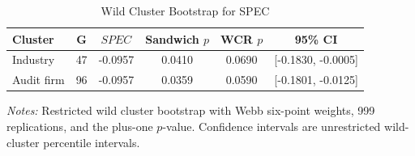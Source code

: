 \begin{table}[H]
    \centering
    \caption{Wild Cluster Bootstrap for SPEC}
    \label{tab:wild_cluster_bootstrap_spec}
    \begin{tabular}{lccccc}
        \toprule
        Cluster & G & \(SPEC\) & Sandwich \(p\) & WCR \(p\) & 95\% CI \\
        \midrule
        Industry & 47 & -0.0957 & 0.0410 & 0.0690 & [-0.1830, -0.0005] \\
        Audit firm & 96 & -0.0957 & 0.0359 & 0.0590 & [-0.1801, -0.0125] \\
        \bottomrule
    \end{tabular}
    \par\smallskip
    \begin{minipage}{0.95\textwidth}
        \footnotesize
        \textit{Notes:} Restricted wild cluster bootstrap with Webb six-point weights, 999 replications, and the plus-one $p$-value. Confidence intervals are unrestricted wild-cluster percentile intervals.
    \end{minipage}
\end{table}
